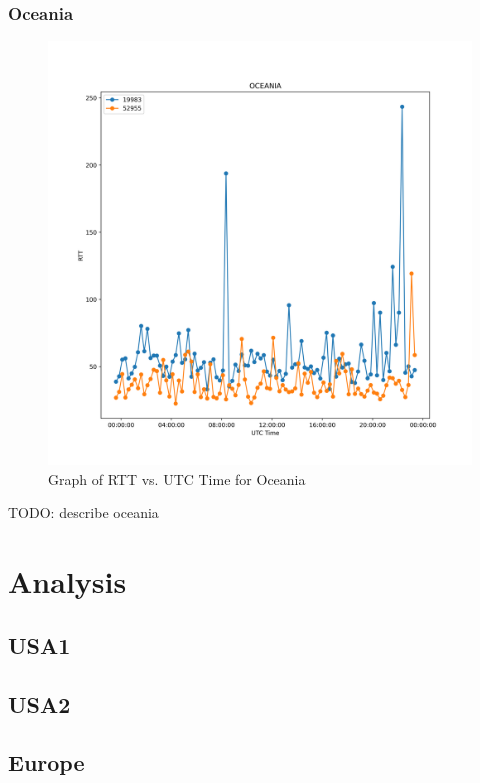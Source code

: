 \documentclass[acmsmall]{acmart}
\begin{document}
\subsubsection{Oceania}
\begin{figure}
    \centering
    \includegraphics[scale=0.5]{graphs/oce.png}
    \caption{Graph of RTT vs. UTC Time for Oceania}
    \label{fig:oceania}
\end{figure}
    
TODO: describe oceania

\section{Analysis}

\subsection{USA1}

\subsection{USA2}

\subsection{Europe}
\end{document}
